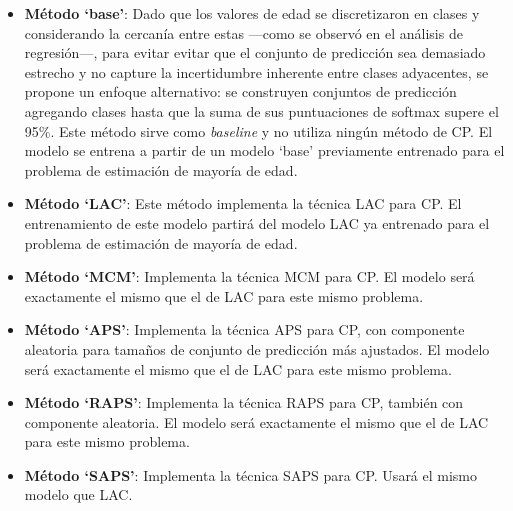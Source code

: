 \begin{itemize}

    \item \textbf{Método `base'}: Dado que los valores de edad se discretizaron en clases y considerando la cercanía entre estas ---como se observó en el análisis de regresión---, para evitar evitar que el conjunto de predicción sea demasiado estrecho y no capture la incertidumbre inherente entre clases adyacentes, se propone un enfoque alternativo: se construyen conjuntos de predicción agregando clases hasta que la suma de sus puntuaciones de softmax supere el 95\%. Este método sirve como \textit{baseline} y no utiliza ningún método de \acrshort{CP}. El modelo se entrena a partir de un modelo `base' previamente entrenado para el problema de estimación de mayoría de edad. 

    \item \textbf{Método `LAC'}: Este método implementa la técnica LAC para \acrshort{CP}. El entrenamiento de este modelo partirá del modelo \acrshort{LAC} ya entrenado para el problema de estimación de mayoría de edad. 

    \item \textbf{Método `MCM'}: Implementa la técnica \acrshort{MCM} para \acrshort{CP}. El modelo será exactamente el mismo que el de LAC para este mismo problema. 

    \item \textbf{Método `APS'}: Implementa la técnica \acrshort{APS} para \acrshort{CP}, con componente aleatoria para tamaños de conjunto de predicción más ajustados. El modelo será exactamente el mismo que el de LAC para este mismo problema.

    \item \textbf{Método `RAPS'}: Implementa la técnica \acrshort{RAPS} para \acrshort{CP}, también con componente aleatoria. El modelo será exactamente el mismo que el de LAC para este mismo problema. 
    
    \item \textbf{Método `SAPS'}: Implementa la técnica \acrshort{SAPS} para \acrshort{CP}. Usará el mismo modelo que \acrshort{LAC}. 

\end{itemize} 

